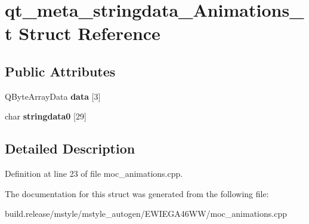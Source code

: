 \hypertarget{structqt__meta__stringdata___animations__t}{}\section{qt\+\_\+meta\+\_\+stringdata\+\_\+\+Animations\+\_\+t Struct Reference}
\label{structqt__meta__stringdata___animations__t}
\subsection*{Public Attributes}
\begin{DoxyCompactItemize}
\item 
\mbox{\label{structqt__meta__stringdata___animations__t_a3d92a612bf4c5ccbc691b8f82a8ae9c0}} 
Q\+Byte\+Array\+Data {\bfseries data} \mbox{[}3\mbox{]}
\item 
\mbox{\label{structqt__meta__stringdata___animations__t_a6d667a89af2280fc65e5c363395d2bd8}} 
char {\bfseries stringdata0} \mbox{[}29\mbox{]}
\end{DoxyCompactItemize}


\subsection{Detailed Description}


Definition at line 23 of file moc\+\_\+animations.\+cpp.



The documentation for this struct was generated from the following file\+:\begin{DoxyCompactItemize}
\item 
build.\+release/mstyle/mstyle\+\_\+autogen/\+E\+W\+I\+E\+G\+A46\+W\+W/moc\+\_\+animations.\+cpp\end{DoxyCompactItemize}
